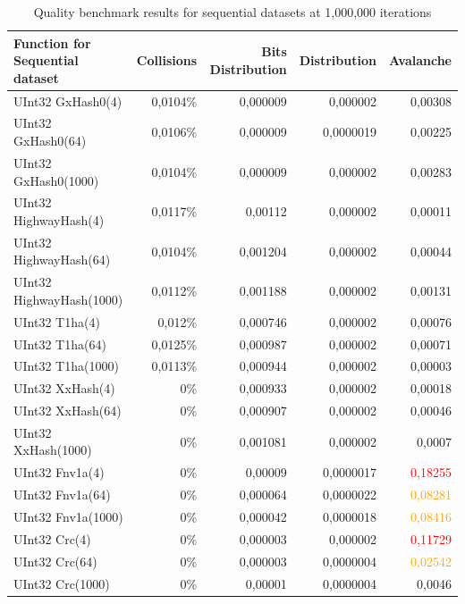 \documentclass[10pt]{article}
\begin{document}
\begin{table}[H]
\centering
\begin{tabular}{|l|r|r|r|r|}
\hline
\textbf{Function for Sequential dataset} & \textbf{Collisions} & \textbf{Bits Distribution} & \textbf{Distribution} & \textbf{Avalanche} \\
\hline
UInt32 GxHash0(4)                & 0,0104\% & 0,000009  & 0,000002 & 0,00308 \\
UInt32 GxHash0(64)               & 0,0106\% & 0,000009  & 0,0000019 & 0,00225 \\
UInt32 GxHash0(1000)             & 0,0104\% & 0,000009  & 0,000002 & 0,00283 \\
UInt32 HighwayHash(4)            & 0,0117\% & 0,00112   & 0,000002 & 0,00011 \\
UInt32 HighwayHash(64)           & 0,0104\% & 0,001204  & 0,000002 & 0,00044 \\
UInt32 HighwayHash(1000)         & 0,0112\% & 0,001188  & 0,000002 & 0,00131 \\
UInt32 T1ha(4)                   & 0,012\%  & 0,000746  & 0,000002 & 0,00076 \\
UInt32 T1ha(64)                  & 0,0125\% & 0,000987  & 0,000002 & 0,00071 \\
UInt32 T1ha(1000)                & 0,0113\% & 0,000944  & 0,000002 & 0,00003 \\
UInt32 XxHash(4)                & 0\%      & 0,000933  & 0,000002 & 0,00018 \\
UInt32 XxHash(64)               & 0\%      & 0,000907  & 0,000002 & 0,00046 \\
UInt32 XxHash(1000)             & 0\%      & 0,001081  & 0,000002 & 0,0007 \\
UInt32 Fnv1a(4)                 & 0\%      & 0,00009   & 0,0000017 & \textcolor{red}{0,18255} \\
UInt32 Fnv1a(64)                & 0\%      & 0,000064  & 0,0000022 & \textcolor{orange}{0,08281} \\
UInt32 Fnv1a(1000)              & 0\%      & 0,000042  & 0,0000018 & \textcolor{orange}{0,08416} \\
UInt32 Crc(4)                   & 0\%      & 0,000003  & 0,000002 & \textcolor{red}{0,11729} \\
UInt32 Crc(64)                  & 0\%      & 0,000003  & 0,0000004 & \textcolor{orange}{0,02542} \\
UInt32 Crc(1000)                & 0\%      & 0,00001   & 0,0000004 & 0,0046 \\
\hline
\end{tabular}
\caption{Quality benchmark results for sequential datasets at 1,000,000 iterations}
\label{tab:my_label}
\end{table}
\end{document}
